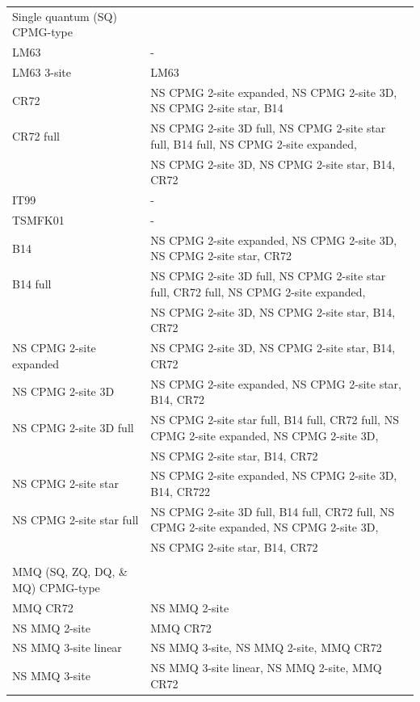 \begin{landscape}
\begin{center}
\begin{small}
\begin{longtable}{ll}
\\[-5pt]
Single quantum (SQ) CPMG-type \\
\cline{1-1}
LM63                             & - \\
LM63 3-site                      & LM63 \\
CR72                             & NS CPMG 2-site expanded, NS CPMG 2-site 3D, NS CPMG 2-site star, B14 \\
CR72 full                        & NS CPMG 2-site 3D full, NS CPMG 2-site star full, B14 full, NS CPMG 2-site expanded, \\
                                 & NS CPMG 2-site 3D, NS CPMG 2-site star, B14, CR72 \\
IT99                             & - \\
TSMFK01                          & - \\
B14                              & NS CPMG 2-site expanded, NS CPMG 2-site 3D, NS CPMG 2-site star, CR72 \\
B14 full                         & NS CPMG 2-site 3D full, NS CPMG 2-site star full, CR72 full, NS CPMG 2-site expanded, \\
                                 & NS CPMG 2-site 3D, NS CPMG 2-site star, B14, CR72 \\
NS CPMG 2-site expanded          & NS CPMG 2-site 3D, NS CPMG 2-site star, B14, CR72 \\
NS CPMG 2-site 3D                & NS CPMG 2-site expanded, NS CPMG 2-site star, B14, CR72 \\
NS CPMG 2-site 3D full           & NS CPMG 2-site star full, B14 full, CR72 full, NS CPMG 2-site expanded, NS CPMG 2-site 3D, \\
                                 & NS CPMG 2-site star, B14, CR72 \\
NS CPMG 2-site star              & NS CPMG 2-site expanded, NS CPMG 2-site 3D, B14, CR722 \\
NS CPMG 2-site star full         & NS CPMG 2-site 3D full, B14 full, CR72 full, NS CPMG 2-site expanded, NS CPMG 2-site 3D, \\
                                 & NS CPMG 2-site star, B14, CR72 \\

\\[-5pt]
MMQ (SQ, ZQ, DQ, \& MQ) CPMG-type \\
\cline{1-1}
MMQ CR72                         & NS MMQ 2-site \\
NS MMQ 2-site                    & MMQ CR72 \\
NS MMQ 3-site linear             & NS MMQ 3-site, NS MMQ 2-site, MMQ CR72 \\
NS MMQ 3-site                    & NS MMQ 3-site linear, NS MMQ 2-site, MMQ CR72 \\


\end{longtable}
\end{small}
\end{center}
\end{landscape}
